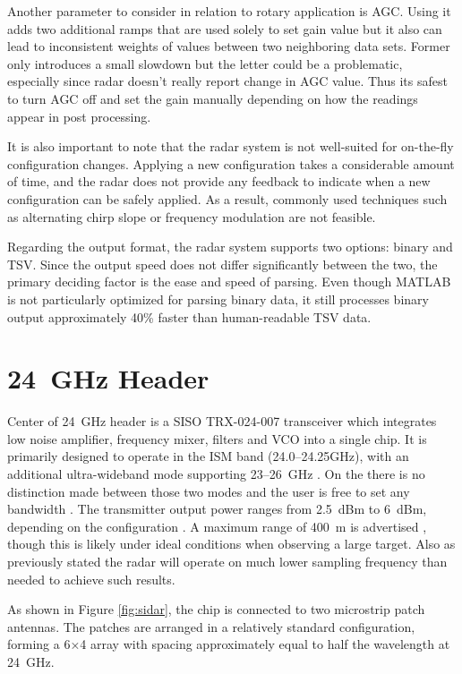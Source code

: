 Another parameter to consider in relation to rotary application is AGC.
Using it adds two additional ramps that are used solely to set gain value but it also can lead to inconsistent weights of values between two neighboring data sets.
Former only introduces a small slowdown but the letter could be a problematic, especially since radar doesn't really report change in AGC value.
Thus its safest to turn AGC off and set the gain manually depending on how the readings appear in post processing.

It is also important to note that the radar system is not well-suited for on-the-fly configuration changes.
Applying a new configuration takes a considerable amount of time, and the radar does not provide any feedback to indicate when a new configuration can be safely applied.
As a result, commonly used techniques such as alternating chirp slope or frequency modulation are not feasible.

Regarding the output format, the radar system supports two options: binary and TSV.
Since the output speed does not differ significantly between the two, the primary deciding factor is the ease and speed of parsing.
Even though MATLAB is not particularly optimized for parsing binary data, it still processes binary output approximately 40\% faster than human-readable TSV data.

\section{24~GHz Header}

Center of 24~GHz header is a SISO TRX-024-007 transceiver which integrates low noise amplifier, frequency mixer, filters and VCO into a single chip.
It is primarily designed to operate in the ISM band (24.0--24.25GHz), with an additional ultra-wideband mode supporting 23--26~GHz \cite{sidarTRX24}.
On the \sidar there is no distinction made between  those two modes and the user is free to set any bandwidth \cite{sidarPRO} .
The transmitter output power ranges from 2.5~dBm to 6~dBm, depending on the configuration \cite{sidarTRX24}.
A maximum range of 400~m is advertised \cite{sidarMANOld}, though this is likely under ideal conditions when observing a large target.
Also as previously stated the radar will operate on much lower sampling frequency than needed to achieve such results.


As shown in Figure \ref{fig:sidar}, the chip is connected to two microstrip patch antennas.
The patches are arranged in a relatively standard configuration, forming a 6×4 array with spacing approximately equal to half the wavelength at 24~GHz.

